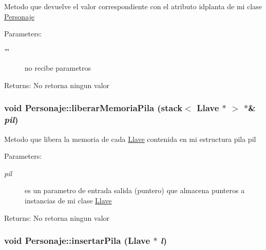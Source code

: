 Metodo que devuelve el valor correspondiente con el atributo idplanta de mi clase \hyperlink{classPersonaje}{Personaje} \begin{Desc}
\item[Parameters:]
\begin{description}
\item[{\em \char`\"{}\char`\"{}}]no recibe parametros \end{description}
\end{Desc}
\begin{Desc}
\item[Returns:]No retorna ningun valor \end{Desc}
\hypertarget{classPersonaje_1ad939228d858b75826ddb4effa67ceb}{
\subsubsection[liberarMemoriaPila]{\setlength{\rightskip}{0pt plus 5cm}void Personaje::liberarMemoriaPila (stack$<$ {\bf Llave} $\ast$ $>$ $\ast$\& {\em pil})}}
\label{classPersonaje_1ad939228d858b75826ddb4effa67ceb}


Metodo que libera la memoria de cada \hyperlink{classLlave}{Llave} contenida en mi estructura pila pil \begin{Desc}
\item[Parameters:]
\begin{description}
\item[{\em pil}]es un parametro de entrada salida (puntero) que almacena punteros a instancias de mi clase \hyperlink{classLlave}{Llave} \end{description}
\end{Desc}
\begin{Desc}
\item[Returns:]No retorna ningun valor \end{Desc}
\hypertarget{classPersonaje_6ede7d70599342ba61eb034027a41f2a}{
\subsubsection[insertarPila]{\setlength{\rightskip}{0pt plus 5cm}void Personaje::insertarPila ({\bf Llave} $\ast$ {\em l})}}
\label{classPersonaje_6ede7d70599342ba61eb034027a41f2a}


